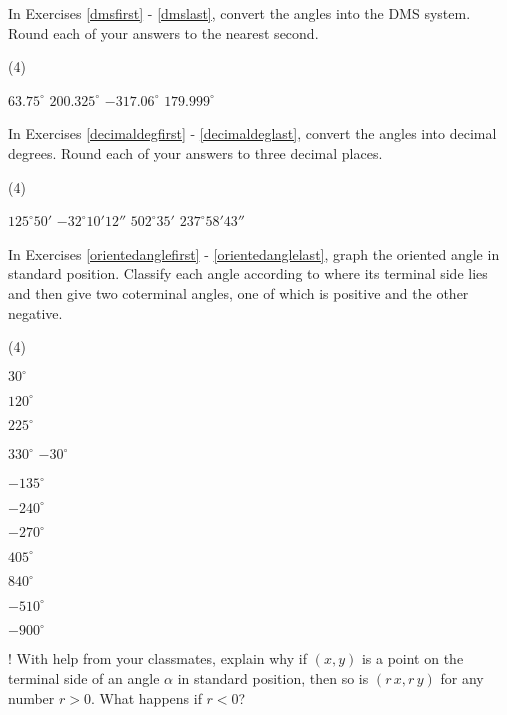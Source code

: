 \label{ExercisesforAppAngles}

In Exercises \ref{dmsfirst} - \ref{dmslast}, convert the angles into the DMS system.  Round each of your answers to the nearest second.

\begin{tasks}(4)

\task $63.75^{\circ}$ \label{dmsfirst}
\task $200.325^{\circ}$
\task $-317.06^{\circ}$
\task $179.999^{\circ}$ \label{dmslast}

\end{tasks}

In Exercises \ref{decimaldegfirst} - \ref{decimaldeglast}, convert the angles into decimal degrees.  Round each of your answers to three decimal places.

\begin{tasks}[resume](4)

\task $125^{\circ} 50'$ \label{decimaldegfirst}
\task $-32^{\circ} 10' 12''$
\task $502^{\circ} 35'$
\task $237^{\circ} 58' 43''$ \label{decimaldeglast}

\end{tasks}

In Exercises \ref{orientedanglefirst} - \ref{orientedanglelast}, graph the oriented angle in standard position. Classify each angle according to where its terminal side lies and then give two coterminal angles, one of which is positive and the other negative.

\begin{tasks}(4)

\task  $30^{\circ}$  \label{orientedanglefirst}

\task  $120^{\circ}$

\task  $225^{\circ}$

\task $330^{\circ}$ 
\task  $-30^{\circ}$

\task $-135^{\circ}$ 

\task $-240^{\circ}$

\task $-270^{\circ}$

\task $405^{\circ}$  

\task $840^{\circ}$ 

\task $-510^{\circ}$

\task $-900^{\circ}$

\label{orientedanglelast}

\task! With help from your classmates, explain why if $(x,y)$ is a point on the terminal side of an angle $\alpha$ in standard position, then so is $(r\,x, r\,y)$ for any number $r > 0$.  What happens if $r < 0$?

\end{tasks}

